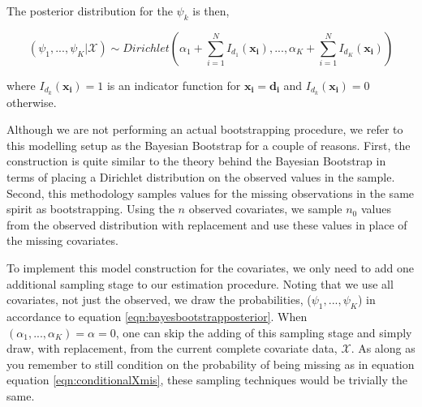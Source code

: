 \documentclass[
  12pt,
]{article}
\begin{document}
The posterior distribution for the \(\psi_k\) is then,

\begin{equation}
\label{eqn:bayesbootstrapposterior}
(\psi_1, ..., \psi_K|\mathcal{X}) \sim Dirichlet(\alpha_1+\sum_{i=1}^N I_{d_1}(\boldsymbol{x_i}),...,\alpha_K+\sum_{i=1}^N I_{d_K}(\boldsymbol{x_i}))
\end{equation}

where \(I_{d_k}(\boldsymbol{x_i})=1\) is an indicator function for
\(\boldsymbol{x_i} = \boldsymbol{d_i}\) and
\(I_{d_k}(\boldsymbol{x_i})=0\) otherwise.

Although we are not performing an actual bootstrapping procedure, we
refer to this modelling setup as the Bayesian Bootstrap
\citep{rubin_bayesian_1981} for a couple of reasons. First, the
construction is quite similar to the theory behind the Bayesian
Bootstrap in terms of placing a Dirichlet distribution on the observed
values in the sample. Second, this methodology samples values for the
missing observations in the same spirit as bootstrapping. Using the
\(n\) observed covariates, we sample \(n_0\) values from the observed
distribution with replacement and use these values in place of the
missing covariates.

To implement this model construction for the covariates, we only need to
add one additional sampling stage to our estimation procedure. Noting
that we use all covariates, not just the observed, we draw the
probabilities, (\(\psi_1, ..., \psi_K\)) in accordance to equation
\ref{eqn:bayesbootstrapposterior}. When
\((\alpha_1, ..., \alpha_K) = \alpha = 0\), one can skip the adding of
this sampling stage and simply draw, with replacement, from the current
complete covariate data, \(\mathcal{X}\). As along as you remember to
still condition on the probability of being missing as in equation
equation \ref{eqn:conditionalXmis}, these sampling techniques would be
trivially the same.
\end{document}
